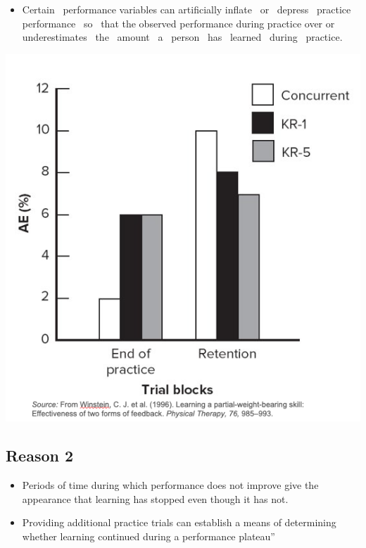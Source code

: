 \documentclass[
  letterpaper,
  DIV=11,
  numbers=noendperiod]{scrartcl}
\providecommand{\tightlist}{%
  \setlength{\itemsep}{0pt}\setlength{\parskip}{0pt}}\usepackage{longtable,booktabs,array}
\begin{document}
\begin{itemize}
\tightlist
\item
  Certain~ performance variables can artificially inflate~ or~ depress~
  practice~ performance~ so~ that the observed performance during
  practice over­ or underestimates~ the~ amount~ a~ person~ has~ learned~
  during~ practice.
\end{itemize}

\includegraphics{images/Screenshot 2023-09-11 at 11.18.17 AM.png}

\hypertarget{reason-2}{%
\subsection{Reason 2}\label{reason-2}}

\begin{itemize}
\tightlist
\item
  Periods of time during which performance does not improve give the
  appearance that learning has stopped even though it has not.
\item
  Providing additional practice trials can establish a means of
  deter­mining~ whether learning continued during a performance plateau''
\end{itemize}
\end{document}
